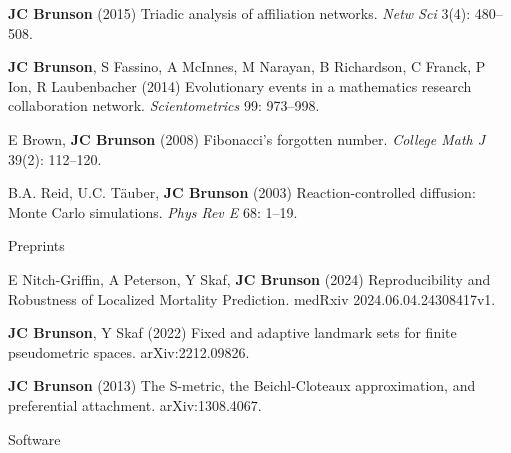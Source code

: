 \documentclass[10pt,a4paper]{article}
\begin{document}
\begin{enumerate}[label={[\arabic*]},labelindent=1cm,nolistsep]
\item
{\bfseries JC Brunson} (2015) Triadic analysis of affiliation networks. {\itshape Netw Sci} 3(4): 480--508.
\item
{\bfseries JC Brunson}, S Fassino, A McInnes, M Narayan, B Richardson, C Franck, P Ion, R Laubenbacher (2014) Evolutionary events in a mathematics research collaboration network. {\itshape Scientometrics} 99: 973--998.
\item
E Brown, {\bfseries JC Brunson} (2008) Fibonacci's forgotten number. {\itshape College Math J} 39(2): 112--120.
\item
B.A. Reid, U.C. T\"{a}uber, {\bfseries JC Brunson} (2003) Reaction-controlled diffusion: Monte Carlo simulations. {\itshape Phys Rev E} 68: 1--19.
\setcounter{paper}{\value{enumi}}
\end{enumerate}
%
\vspace{.25cm}
{\sc Preprints}
\begin{enumerate}[label={[\arabic*]},labelindent=1cm,nolistsep]
\setcounter{enumi}{\value{paper}}
\item
E Nitch-Griffin, A Peterson, Y Skaf, {\bfseries JC Brunson} (2024) Reproducibility and Robustness of Localized Mortality Prediction. medRxiv 2024.06.04.24308417v1.
\item
{\bfseries JC Brunson}, Y Skaf (2022) Fixed and adaptive landmark sets for finite pseudometric spaces. arXiv:2212.09826.
\item
{\bfseries JC Brunson} (2013) The S-metric, the Beichl-Cloteaux approximation, and preferential attachment. arXiv:1308.4067.
\setcounter{paper}{\value{enumi}}
\end{enumerate}
%
\vspace{.25cm}
{\sc Software}
\end{document}
